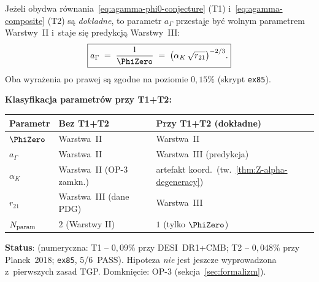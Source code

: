 \begin{hypothesis}%
\label{hyp:agamma-phi0-combo}
Je\.zeli obydwa r\'ownania~\eqref{eq:agamma-phi0-conjecture} (T1)
i~\eqref{eq:agamma-composite} (T2) s\k{a} \emph{dok\l{}adne},
to parametr $a_\Gamma$ przesta\k{j}e by\'c wolnym parametrem Warstwy~II
i~staje si\k{e} predykcj\k{a} Warstwy~III:
\begin{equation}\label{eq:agamma-layer3}
  \boxed{%
    a_\Gamma \;=\; \frac{1}{\PhiZero}
    \;=\; \bigl(\alpha_K\,\sqrt{r_{21}}\bigr)^{-2/3}.
  }
\end{equation}
Oba wyra\.zenia po prawej s\k{a} zgodne na poziomie $0{,}15\%$
(skrypt \texttt{ex85}).

\medskip\noindent
\textbf{Klasyfikacja parametr\'ow przy T1+T2:}
\begin{center}\footnotesize
\begin{tabular}{lll}
\toprule
Parametr & Bez T1+T2 & Przy T1+T2 (dok\l{}adne) \\
\midrule
$\PhiZero$ & Warstwa~II & Warstwa~II \\
$a_\Gamma$ & Warstwa~II & Warstwa~III (predykcja) \\
$\alpha_K$ & Warstwa~II (OP-3 zamkn.) & artefakt koord.\ (tw.~\ref{thm:Z-alpha-degeneracy}) \\
$r_{21}$ & Warstwa~III (dane PDG) & Warstwa~III \\
\midrule
$N_{\rm param}$ & $2$ (Warstwy II) & $1$ (tylko $\PhiZero$) \\
\bottomrule
\end{tabular}
\end{center}

\medskip\noindent
\textbf{Status}:  (numeryczna: T1 -- $0{,}09\%$
przy DESI~DR1+CMB; T2 -- $0{,}048\%$ przy Planck~2018; \texttt{ex85}, 5/6~PASS).
Hipoteza \emph{nie} jest jeszcze wyprowadzona z~pierwszych zasad TGP.
Domkni\k{e}cie: OP-3 (sekcja~\ref{sec:formalizm}).
\end{hypothesis}

